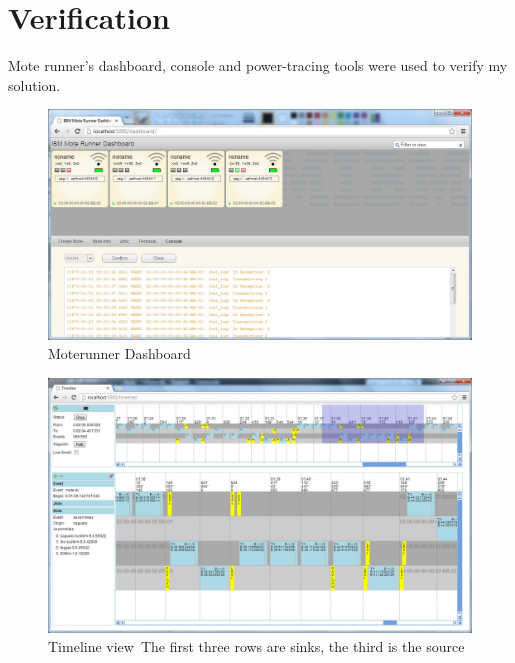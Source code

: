 \documentclass{article}
\begin{document}

\section{Verification}

Mote runner's dashboard, console and power-tracing tools were used to verify my solution.

\noindent\begin{figure}
\centerline{\includegraphics[scale=0.5]{verification-dashboard}}
\caption{Moterunner Dashboard}
\label{fig:verification-dashboard}
\end{figure}
\noindent\begin{figure}
\centerline{\includegraphics[scale=0.5]{verification-timeline}}
\caption{Timeline view\
The first three rows are sinks, the third is the source
}
\label{fig:verification-dashboard}
\end{figure}
\end{document}
